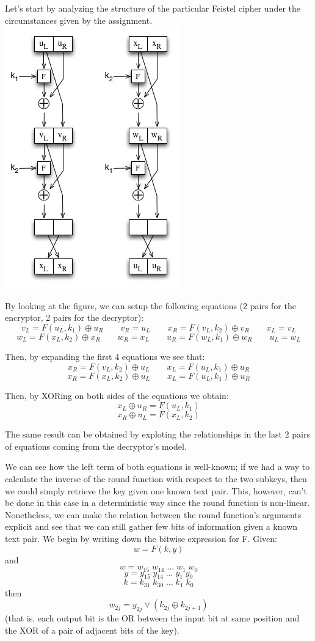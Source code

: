 \documentclass[a4paper,12pt,titlepage]{article}
\begin{document}
Let's start by analyzing the structure of the particular Feistel cipher under
the circumstances given by the assignment. \\

\includegraphics{2_rounds_feistel.jpg}

By looking at the figure, we can setup the following equations (2 pairs for the
encryptor, 2 pairs for the decryptor):
\[v_L = F(u_L, k_1) \oplus u_R \qquad v_R = u_L \qquad x_R = F(v_L, k_2) \oplus v_R \qquad x_L = v_L\]
\[w_L = F(x_L, k_2) \oplus x_R \qquad w_R = x_L \qquad u_R = F(w_L, k_1) \oplus w_R \qquad u_L = w_L\]

Then, by expanding the first 4 equations we see that:
\[ x_R = F(v_L, k_2) \oplus u_L \qquad x_L = F(u_L, k_1) \oplus u_R \]
\[ x_R = F(x_L, k_2) \oplus u_L \qquad x_L = F(u_L, k_1) \oplus u_R \]

Then, by XORing on both sides of the equations we obtain:
\[x_L \oplus u_R = F(u_L, k_1)\]
\[x_R \oplus u_L = F(x_L, k_2)\]

The same result can be obtained by exploting the relationships in the last 2
pairs of equations coming from the decryptor's model.

We can see how the left term of both equations is well-known; if we had a way
to calculate the inverse of the round function with respect to the two subkeys,
then we could simply retrieve the key given one known text pair. This, however,
can't be done in this case in a deterministic way since the round function is
non-linear. Nonetheless, we can make the relation between the round function's
arguments explicit and see that we can still gather few bits of information
given a known text pair. We begin by writing down the bitwise expression for F.
Given:
\[w = F(k, y)\]
and
\[w = w_{15} \; w_{14} \; ... \; w_1 \; w_0\]
\[y = y_{15} \; y_{14} \; ... \; y_1 \; y_0\]
\[k = k_{31} \; k_{30} \; ... \; k_1 \; k_0\]
then
\[w_{2j} = y_{2j} \vee (k_{2j} \oplus k_{2j+1})\]
(that is, each output bit is the OR between the input bit at same position and
the XOR of a pair of adjacent bits of the key).
\end{document}
